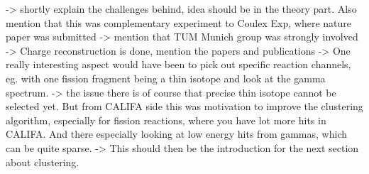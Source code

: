 -> shortly explain the challenges behind, idea should be in the theory part. Also mention that this was complementary experiment to Coulex Exp, where nature paper was submitted
-> mention that TUM Munich group was strongly involved
-> Charge reconstruction is done, mention the papers and publications
-> One really interesting aspect would have been to pick out specific reaction channels, eg. with one fission fragment being a thin isotope and look at the gamma spectrum. 
-> the issue there is of course that precise thin isotope cannot be selected yet. But from CALIFA side this was motivation to improve the clustering algorithm, especially for fission reactions, where you have lot more hits in CALIFA. And there especially looking at low energy hits from gammas, which can be quite sparse.
-> This should then be the introduction for the next section about clustering.
